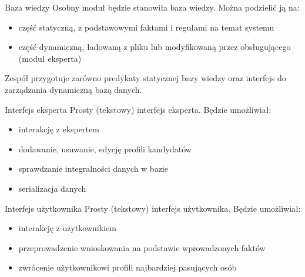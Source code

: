 \documentclass{beamer}
\begin{document}
\begin{frame}

	\begin{block}{Baza wiedzy}
		Osobny moduł będzie stanowiła baza wiedzy. Można podzielić ją na:
		\begin{itemize}
			\item część statyczną, z podstawowymi faktami i regułami na temat systemu
			\item część dynamiczną, ładowaną z pliku lub modyfikowaną przez obsługującego (moduł eksperta)
		\end{itemize}
		Zespół przygotuje zarówno predykaty statycznej bazy wiedzy oraz interfejs do zarządzania dynamiczną bazą danych.
	\end{block}

\end{frame}

\begin{frame}
	
	\begin{block}{Interfejs eksperta}
		Prosty (tekstowy) interfejs eksperta. Będzie umożliwiał:  
		\begin{itemize}
		    \item interakcję z ekspertem
		    \item dodawanie, usuwanie, edycję profili kandydatów
		    \item sprawdzanie integralności danych w bazie
		    \item serializacja danych
		\end{itemize}
	\end{block}

\end{frame}

\begin{frame}
	
	\begin{block}{Interfejs użytkownika}
		Prosty (tekstowy) interfejs użytkownika. Będzie umożliwiał:  
		\begin{itemize}
		    \item interakcję z użytkownikiem
		    \item przeprowadzenie wnioskowania na podstawie wprowadzonych faktów
		    \item zwrócenie użytkownikowi profili najbardziej pasujących osób
		\end{itemize}
	\end{block}

\end{frame}
\end{document}
